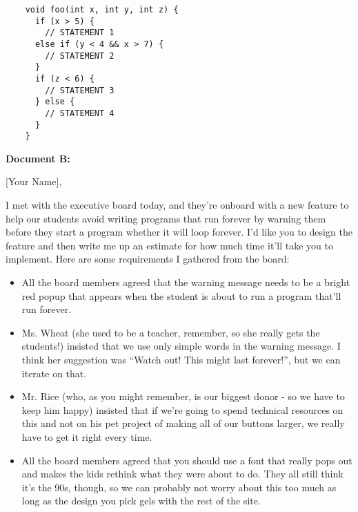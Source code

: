 \documentclass{report}
\begin{document}
\begin{spacing}{1.4}
\begin{enumerate}[leftmargin=*]
    \begin{lstlisting}
    void foo(int x, int y, int z) {
      if (x > 5) {
        // STATEMENT 1
      else if (y < 4 && x > 7) {
        // STATEMENT 2
      }
      if (z < 6) {
        // STATEMENT 3
      } else {
        // STATEMENT 4
      }
    }
    \end{lstlisting}

\vspace{0.5in}
    
    \textbf{Document B:}

    [Your Name],

    I met with the executive board today, and they're onboard with a new feature to help our students avoid
    writing programs that run forever by warning them before they start a program whether it will loop forever.
    I'd like you to design the feature and then write me up an estimate for how much time it'll take you to
    implement. Here are some requirements I gathered from the board:
    \begin{itemize}
    \item All the board members agreed that the warning message needs to be a bright red popup that appears
      when the student is about to run a program that'll run forever.
    \item Ms. Wheat (she used to be a teacher, remember, so she really gets the students!) insisted that we
      use only simple words in the warning message. I think her suggestion was ``Watch out! This might last forever!'', but
      we can iterate on that.
    \item Mr. Rice (who, as you might remember, is our biggest donor - so we have to keep him happy) insisted that
      if we're going to spend technical resources on this and not on his pet project of making all of our buttons larger,
      we really have to get it right every time.
    \item All the board members agreed that you should use a font that really pops out and makes the kids rethink what
      they were about to do. They all still think it's the 90s, though, so we can probably not worry about this too much
      as long as the design you pick gels with the rest of the site.
    \end{itemize}


\end{enumerate}
\end{spacing}
\end{document}
